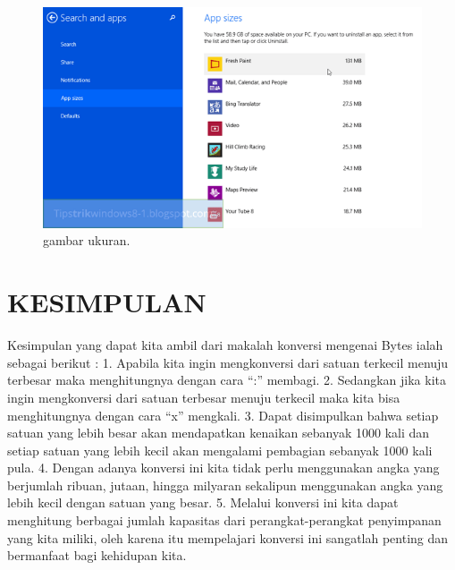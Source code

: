 \begin{figure}[ht]
\centerline{\includegraphics[width=1\textwidth]{figures/ukuran.PNG}}
\caption{gambar ukuran.}
\label{ukuran.png}
\end{figure}

\section {KESIMPULAN}
Kesimpulan yang dapat kita ambil dari makalah konversi mengenai Bytes ialah sebagai berikut :
1.	Apabila kita ingin mengkonversi dari satuan terkecil menuju terbesar maka menghitungnya dengan cara “:” membagi.
2.	Sedangkan jika kita ingin mengkonversi dari satuan terbesar menuju terkecil maka kita bisa menghitungnya dengan cara “x” mengkali.
3.	Dapat disimpulkan bahwa setiap satuan yang lebih besar akan mendapatkan kenaikan sebanyak 1000 kali dan setiap satuan yang lebih kecil akan mengalami pembagian sebanyak 1000 kali pula.
4.	Dengan adanya konversi ini kita tidak perlu menggunakan angka yang berjumlah ribuan, jutaan, hingga milyaran sekalipun menggunakan angka yang lebih kecil dengan satuan yang besar.
5.	Melalui konversi ini kita dapat menghitung berbagai jumlah kapasitas dari perangkat-perangkat penyimpanan yang kita miliki, oleh karena itu mempelajari konversi ini sangatlah penting dan bermanfaat bagi kehidupan kita. \cite{jungwirth2002information}